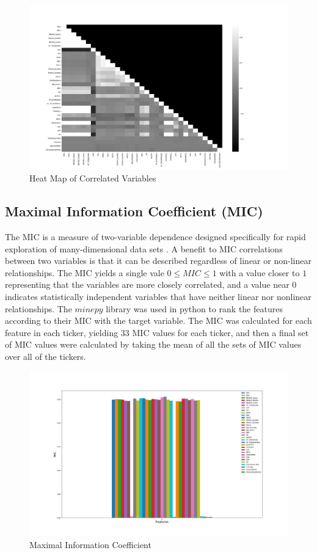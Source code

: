 \documentclass{article}
\begin{document}
\begin{figure}[h!]
	\centering
	\includegraphics[width=\linewidth]{data/heatmapT1.png}
	\caption{Heat Map of Correlated Variables}
	\label{fig:corr_heatmap}
\end{figure}

\subsection{Maximal Information Coefficient (MIC)}
The MIC is a measure of two-variable dependence designed specifically for rapid exploration of many-dimensional data sets \cite{reshef2011detecting}. A benefit to MIC correlations between two variables is that it can be described regardless of linear or non-linear relationships. The MIC yields a single vale $0 \leq MIC \leq 1$ with a value closer to $1$ representing that the variables are more closely correlated, and a value near $0$ indicates statistically independent variables that have neither linear nor nonlinear relationships. The $minepy$ library was used in python to rank the features according to their MIC with the target variable. The MIC was calculated for each feature in each ticker, yielding 33 MIC values for each ticker, and then a final set of MIC values were calculated by taking the mean of all the sets of MIC values over all of the tickers.

\begin{figure}[h!]
	\centering
	\includegraphics[width=\linewidth]{data/MICT1.png}
	\caption{Maximal Information Coefficient}
	\label{fig:MIC}
\end{figure}
\end{document}
